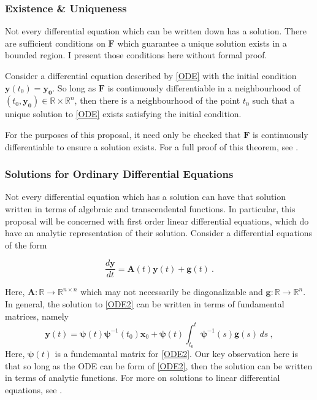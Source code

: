 \subsubsection{Existence \& Uniqueness}

Not every differential equation which can be written down has a solution. There are sufficient conditions on $\mathbf{F}$ which guarantee a unique solution exists in a bounded region.  I present those conditions here without formal proof.

Consider a differential equation described by \cref{ODE} with the initial condition  $ \mathbf{y}(t_0) = \mathbf{y_0} $. So long as $\mathbf{F}$ is continuously differentiable in a neighbourhood of $ (t_0, \mathbf{y_0}) \in \mathbb{R}\times\mathbb{R}^n $, then there is a neighbourhood of the point $ t_0 $ such that a unique solution to \cref{ODE} exists satisfying the initial condition.

For the purposes of this proposal, it need only be checked that $ \mathbf{F} $ is continuously differentiable to ensure a solution exists.  For a full proof of this theorem, see \cite{miller1982ordinary,morris1963ordinary}.

\subsubsection{Solutions for Ordinary Differential Equations}

Not every differential equation which has a solution can have that solution written in terms of algebraic and transcendental functions.  In particular, this proposal will be concerned with first order linear differential equations, which do have an analytic representation of their solution.  Consider a differential equations of the form

\begin{equation}\label{ODE2}
\dfrac{d\mathbf{y}}{dt} = \mathbf{A}(t)\mathbf{y}(t) + \mathbf{g}(t) \>.
\end{equation}

Here, $ \mathbf{A}: \mathbb{R} \rightarrow \mathbb{R}^{n \times n} $ which may not necessarily be diagonalizable and $ \mathbf{g}:  \mathbb{R} \rightarrow \mathbb{R}^n $.  In general, the solution to \cref{ODE2} can be written in terms of fundamental matrices, namely
%
\begin{equation}\label{ODE2_solution}
\mathbf{y}(t) = \bm{\psi}(t)\bm{\psi}^{-1}(t_0)\mathbf{x}_0 + \bm{\psi}(t)\int_{t_0}^{t}\bm{\psi}^{-1}(s) \mathbf{g}(s) \, ds \>,
\end{equation}
%
Here, $ \bm{\psi}(t) $ is a fundemantal matrix for \cref{ODE2}. Our key observation here is that so long as the ODE can be form of \cref{ODE2}, then the solution can be written in terms of analytic functions.  For more on solutions to linear differential equations, see \cite{boyce2012differential}.
